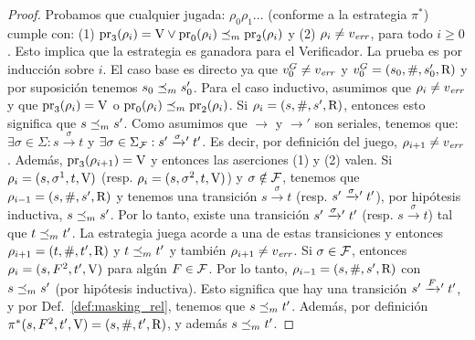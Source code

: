 \begin{proof}
	Probamos que cualquier jugada: $\rho_0 \rho_1 \dots$ (conforme a la estrategia $\pi^*$) cumple con: 
	(1) $\operatorname{pr}_{3}(\rho_i)=\mathrm{V} \vee \operatorname{pr}_{0}(\rho_i) \preceq_{m} \operatorname{pr}_{2}(\rho_i)$ y 
	(2) $\rho_i \neq v_{\mathit{err}}$, para todo $i\geq 0$. Esto implica que la estrategia es ganadora para el Verificador. 
La prueba es por inducción sobre $i$. El caso base es directo ya que 
$v_0^G \neq v_{\mathit{err}}$ y $v_0^G = (s_0, \#, s'_0, \mathrm{R})$ y por suposición tenemos $s_0 \preceq_{m} s'_0$. Para el caso inductivo, asumimos que 
$\rho_i \neq v_{\mathit{err}}$ y que $\operatorname{pr}_{3}(\rho_i) = \mathrm{V}$ o $\operatorname{pr}_{0}(\rho_i) \preceq_{m} \operatorname{pr}_{2}(\rho_i)$. 
Si $\rho_i = (s, \#, s', \mathrm{R})$, entonces esto significa que $s \preceq_{m} s'$. Como asumimos que
$\rightarrow$ y $\rightarrow'$ son seriales, tenemos que: $\exists \sigma \in \Sigma: s \xrightarrow{\sigma} t$ y $\exists \sigma \in \Sigma_{\mathcal{F}} : s' \mathrel{{\xrightarrow[]{\sigma}}{}'} t'$. Es decir, por definición del juego, $\rho_{i+1} \neq v_{\mathit{err}}$. 
Además, $\operatorname{pr}_{3}(\rho_{i+1}) = \mathrm{V}$ y entonces las aserciones (1) y (2) valen. 
Si $\rho_i = (s, \sigma^1, t, \mathrm{V})$ (resp. $\rho_i = (s, \sigma^2, t, \mathrm{V})$) y $\sigma \notin \mathcal{F}$,
tenemos que $\rho_{i-1} = (s, \#, s', \mathrm{R})$ y tenemos una transición $s \xrightarrow{\sigma} t$ (resp. $s' \mathrel{{\xrightarrow[]{\sigma}}{}'} t'$), por hipótesis inductiva, $s \preceq_{m} s'$. 
Por lo tanto, existe una transición $s' \mathrel{{\xrightarrow[]{\sigma}}{}'} t'$ (resp.  $s \xrightarrow{\sigma} t$) tal que $t \preceq_{m} t'$. 
La estrategia juega acorde a una de estas transiciones y entonces
$\rho_{i+1} = (t, \#, t', \mathrm{R})$ y $t \preceq_{m} t'$ y también $\rho_{i+1} \neq v_{\mathit{err}}$. Si $\sigma \in \mathcal{F}$, entonces $\rho_i = (s, F^2, t', \mathrm{V})$ para algún $F \in \mathcal{F}$. 
Por lo tanto, $\rho_{i-1} = (s, \#, s', \mathrm{R})$ con $s \preceq_{m} s'$ (por hipótesis inductiva). Esto significa que hay una transición $s' \mathrel{{\xrightarrow[]{F}}{}'} t'$, y por Def.~\ref{def:masking_rel},
tenemos que $s \preceq_{m} t'$. Además, por definición $\pi^*(s, F^2, t', \mathrm{V}) = (s, \#,t',\mathrm{R})$, 
y además $s \preceq_{m} t'$. 


\end{proof}
